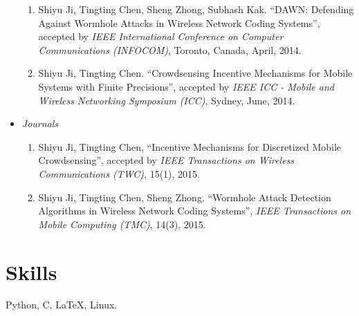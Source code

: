 \documentclass{res}
\begin{document}
\begin{resume}
\begin{itemize}
\begin{enumerate}
\item Shiyu Ji, Tingting Chen, Sheng Zhong, Subhash Kak. ``DAWN: Defending Against Wormhole Attacks in Wireless Network Coding Systems'', accepted by {\it IEEE International Conference on Computer Communications (INFOCOM)}, Toronto, Canada, April, 2014.

\item Shiyu Ji, Tingting Chen. ``Crowdsensing Incentive Mechanisms for Mobile Systems with Finite Precisions'', accepted by {\it IEEE ICC - Mobile and Wireless Networking Symposium (ICC)}, Sydney, June, 2014.
\end{enumerate}

\item{\it Journals}
\begin{enumerate}
\item Shiyu Ji, Tingting Chen, ``Incentive Mechanisms for Discretized Mobile Crowdsensing'', accepted by {\it IEEE Transactions on Wireless Communications (TWC)}, 15(1), 2015.

\item Shiyu Ji, Tingting Chen, Sheng Zhong. ``Wormhole Attack Detection Algorithms in Wireless Network Coding Systems'', {\it IEEE Transactions on Mobile Computing (TMC)}, 14(3), 2015.

\end{enumerate}
\end{itemize}

\section{\sc Skills}
Python, C, \LaTeX, Linux.


\end{resume}
\end{document}
